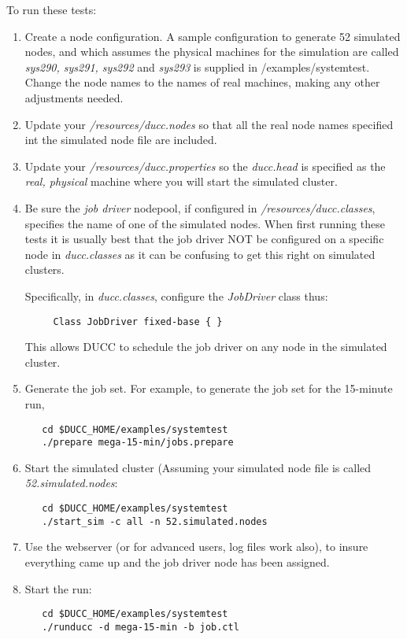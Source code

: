      To run these tests:
     \begin{enumerate}
       \item Create a node configuration.  A sample configuration to generate
         52 simulated nodes, and which assumes the
         physical machines for the simulation are called {\em sys290, sys291, sys292}
         and {\em sys293} is supplied in \duccruntime/examples/systemtest. Change
         the node names to the names of real machines, making any other adjustments
         needed.
       \item Update your {\em \duccruntime/resources/ducc.nodes} so that all the real node names specified
         int the simulated node file are included.
       \item Update your {\em \duccruntime/resources/ducc.properties} so the 
         {\em ducc.head} is specified as the {\em real, physical} machine where you will
         start the simulated cluster.
       \item Be sure the {\em job driver} nodepool, if configured in
         {\em \duccruntime/resources/ducc.classes}, specifies the name of one of the
         simulated nodes.  When first running these tests it is usually best that
         the job driver NOT be configured on a specific node in {\em ducc.classes}
         as it can be confusing to get this right on simulated clusters.

         Specifically, in {\em ducc.classes}, configure the {\em JobDriver} class
         thus:
\begin{verbatim}
     Class JobDriver fixed-base { }
\end{verbatim}
         This allows DUCC to schedule the job driver on any node in the simulated
         cluster.
        
       \item Generate the job set.  For example, to generate the job set for the
         15-minute run,
\begin{verbatim}
   cd $DUCC_HOME/examples/systemtest
   ./prepare mega-15-min/jobs.prepare
\end{verbatim}
         \item Start the simulated cluster (Assuming your simulated node file is called
           {\em 52.simulated.nodes}:
\begin{verbatim}
   cd $DUCC_HOME/examples/systemtest
   ./start_sim -c all -n 52.simulated.nodes
\end{verbatim}
         \item Use the webserver (or for advanced users, log files work also), to insure
           everything came up and the job driver node has been assigned.
         \item Start the run:
\begin{verbatim}
   cd $DUCC_HOME/examples/systemtest
   ./runducc -d mega-15-min -b job.ctl
\end{verbatim}             
         \end{enumerate}
     
